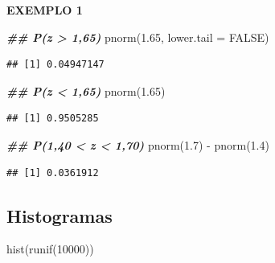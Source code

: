 \documentclass[
]{article}
\newenvironment{Shaded}{\begin{snugshade}}{\end{snugshade}}
\newcommand{\AttributeTok}[1]{\textcolor[rgb]{0.77,0.63,0.00}{#1}}
\newcommand{\ConstantTok}[1]{\textcolor[rgb]{0.00,0.00,0.00}{#1}}
\newcommand{\DecValTok}[1]{\textcolor[rgb]{0.00,0.00,0.81}{#1}}
\newcommand{\DocumentationTok}[1]{\textcolor[rgb]{0.56,0.35,0.01}{\textbf{\textit{#1}}}}
\newcommand{\FloatTok}[1]{\textcolor[rgb]{0.00,0.00,0.81}{#1}}
\newcommand{\FunctionTok}[1]{\textcolor[rgb]{0.00,0.00,0.00}{#1}}
\newcommand{\NormalTok}[1]{#1}
\newcommand{\SpecialCharTok}[1]{\textcolor[rgb]{0.00,0.00,0.00}{#1}}
\begin{document}
\textbf{EXEMPLO 1}

\begin{Shaded}
\begin{Highlighting}[]
\DocumentationTok{\#\# P(z \textgreater{} 1,65)}
\FunctionTok{pnorm}\NormalTok{(}\FloatTok{1.65}\NormalTok{, }\AttributeTok{lower.tail =} \ConstantTok{FALSE}\NormalTok{)}
\end{Highlighting}
\end{Shaded}

\begin{verbatim}
## [1] 0.04947147
\end{verbatim}

\begin{Shaded}
\begin{Highlighting}[]
\DocumentationTok{\#\# P(z \textless{} 1,65)}
\FunctionTok{pnorm}\NormalTok{(}\FloatTok{1.65}\NormalTok{)}
\end{Highlighting}
\end{Shaded}

\begin{verbatim}
## [1] 0.9505285
\end{verbatim}

\begin{Shaded}
\begin{Highlighting}[]
\DocumentationTok{\#\# P(1,40 \textless{} z \textless{} 1,70)}
\FunctionTok{pnorm}\NormalTok{(}\FloatTok{1.7}\NormalTok{) }\SpecialCharTok{{-}} \FunctionTok{pnorm}\NormalTok{(}\FloatTok{1.4}\NormalTok{)}
\end{Highlighting}
\end{Shaded}

\begin{verbatim}
## [1] 0.0361912
\end{verbatim}

\hypertarget{histogramas}{%
\subsection{Histogramas}\label{histogramas}}

\begin{Shaded}
\begin{Highlighting}[]
\FunctionTok{hist}\NormalTok{(}\FunctionTok{runif}\NormalTok{(}\DecValTok{10000}\NormalTok{))}
\end{Highlighting}
\end{Shaded}
\end{document}

